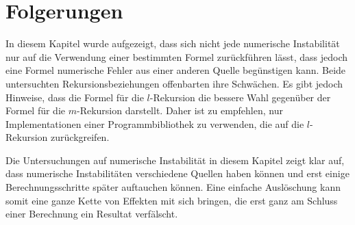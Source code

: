 %
%
%
\section{Folgerungen
\label{legendre:section:folgerungen}}
In diesem Kapitel wurde aufgezeigt, dass sich nicht jede numerische Instabilität nur auf die Verwendung einer bestimmten Formel zurückführen lässt, dass jedoch eine Formel numerische Fehler aus einer anderen Quelle begünstigen kann.
Beide untersuchten Rekursionsbeziehungen offenbarten ihre Schwächen.
Es gibt jedoch Hinweise, dass die Formel für die $l$-Rekursion die bessere Wahl gegenüber der Formel für die $m$-Rekursion darstellt.
Daher ist zu empfehlen, nur Implementationen einer Programmbibliothek zu verwenden, die auf die $l$-Rekursion zurückgreifen.

Die Untersuchungen auf numerische Instabilität in diesem Kapitel zeigt klar auf, dass numerische Instabilitäten verschiedene Quellen haben können und erst einige Berechnungsschritte später auftauchen können.
Eine einfache Auslöschung kann somit eine ganze Kette von Effekten mit sich bringen, die erst ganz am Schluss einer Berechnung ein Resultat verfälscht.
